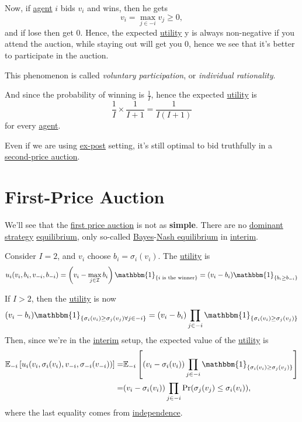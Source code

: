 Now, if \hyperref[def:player]{agent} \(i\) bids \(v_{i}\) and wins, then he gets
\[
	v_{i} = \max_{j\in -i} v_{j}\geq 0,
\]
and if lose then get \(0\). Hence, the expected \hyperref[def:reward]{utility} y is always non-negative if you attend the auction, while staying out will get you \(0\), hence we see that it's better to participate in the auction.

\begin{remark}\label{rmk:voluntary-participation}
	This phenomenon is called \emph{voluntary participation}, or \emph{individual rationality}.
\end{remark}

And since the probability of winning is \(\frac{1}{I}\), hence the expected \hyperref[def:reward]{utility} is
\[
	\frac{1}{I}\times \frac{1}{I+1} = \frac{1}{I(I + 1)}
\]
for every \hyperref[def:player]{agent}.

\begin{note}
	Even if we are using \hyperref[def:ex-post]{ex-post} setting, it's still optimal to bid truthfully in a \hyperref[eg:second-price-auction]{second-price auction}.
\end{note}

\section{First-Price Auction}
We'll see that the \hyperref[eg:first-price-auction]{first price auction} is not as \textbf{simple}. There are no \hyperref[def:dominant-strategy]{dominant strategy} \hyperref[def:Nash-equilibrium]{equilibrium}, only so-called \hyperref[def:mathematical-Bayesian-game]{Bayes}-\hyperref[def:Nash-equilibrium]{Nash equilibrium} in \hyperref[def:interim]{interim}.

Consider \(I = 2\), and \(v_{i}\) choose \(b_{i} = \sigma_{i}(v_{i})\). The \hyperref[def:reward]{utility}  is
\[
	u_{i}(v_{i}, b_{i}, v_{-i}, b_{-i}) = \left(v_{i} - \max_{j\in \mathcal{I} }b_{i}\right)\mathbbm{1}_{\{ i \text{ is the winner} \}} = (v_{i} - b_{i})\mathbbm{1}_{\{ b_{i}\geq b_{-i} \}}
\]

If \(I>2\), then the \hyperref[def:reward]{utility}  is now
\[
	(v_{i} - b_{i})\mathbbm{1}_{\{ \sigma_{i}(v_{i})\geq \sigma_{j}(v_{j})\forall j\in -i \}} = (v_{i} - b_{i})\prod\limits_{j\in -i} \mathbbm{1}_{\{ \sigma_{i}(v_{i})\geq \sigma_{j}(v_{j}) \}}
\]
Then, since we're in the \hyperref[def:interim]{interim} setup, the expected value of the \hyperref[def:reward]{utility}  is
\[
	\begin{split}
		\mathbb{E}_{-i}\left[u_{i}(v_{i}, \sigma_{i}(v_{i}), v_{-i}, \sigma_{-i}(v_{-i})) \right]
		= &\mathbb{E}_{-i}\left[(v_{i} - \sigma_{i}(v_{i})) \prod\limits_{j\in -i}\mathbbm{1}_{\{ \sigma_{i}(v_{i})\geq \sigma_{j}(v_{j}) \}} \right]\\
		= &(v_{i} - \sigma_{i}(v_{i}))\prod\limits_{j\in -i}\Pr(\sigma_{j}(v_{j})\leq \sigma_{i}(v_{i})),
	\end{split}
\]
where the last equality comes from \hyperref[def:independent]{independence}.

